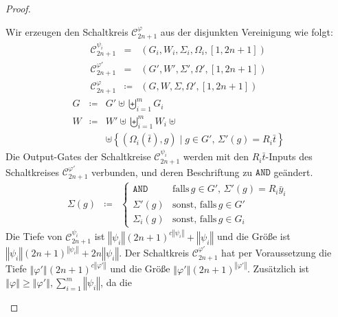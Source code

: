 \begin{proof}
\begin{casenv}
Wir erzeugen den Schaltkreis $\mathcal{C}_{2n+1}^{\varphi}$ aus der
disjunkten Vereinigung wie folgt:
\begin{eqnarray*}
\mathcal{C}_{2n+1}^{\psi_{i}} & = & \left(G_{i},W_{i},\Sigma_{i},\Omega_{i},\left[1,2n+1\right]\right)\\
\mathcal{C}_{2n+1}^{\varphi'} & = & \left(G',W',\Sigma',\Omega',\left[1,2n+1\right]\right)\\
\mathcal{C}_{2n+1}^{\varphi} & \coloneqq & \left(G,W,\Sigma,\Omega',\left[1,2n+1\right]\right)
\end{eqnarray*}
\begin{eqnarray*}
G & \coloneqq & G'\uplus\biguplus_{i=1}^{m}G_{i}\\
W & \coloneqq & W'\uplus\biguplus_{i=1}^{m}W_{i}\uplus\\
 &  & \uplus\left\{ \left(\Omega_{i}\left(\bar{t}\right),g\right)\mid g\in G',\,\Sigma'\left(g\right)=R_{i}\bar{t}\right\} 
\end{eqnarray*}
Die Output-Gates der Schaltkreise $\mathcal{C}_{2n+1}^{\psi_{i}}$
werden mit den $R_{i}\bar{t}$-Inputs des Schaltkreises $\mathcal{C}_{2n+1}^{\varphi'}$
verbunden, und deren Beschriftung zu $\mathtt{AND}$ geändert. 
\begin{eqnarray*}
\Sigma\left(g\right) & \coloneqq & \begin{cases}
\mathtt{AND} & \mathrm{falls}\,g\in G',\,\Sigma'\left(g\right)=R_{i}\bar{y}_{i}\\
\Sigma'\left(g\right) & \mathrm{sonst,\,falls}\,g\in G'\\
\Sigma_{i}\left(g\right) & \mathrm{sonst,\,falls}\,g\in G_{i}
\end{cases}
\end{eqnarray*}
Die Tiefe von $\mathcal{C}_{2n+1}^{\psi_{i}}$ ist $\left\Vert \psi_{i}\right\Vert \left(2n+1\right)^{c\left\Vert \psi_{i}\right\Vert }+\left\Vert \psi_{i}\right\Vert $
und die Größe ist $\left\Vert \psi_{i}\right\Vert \left(2n+1\right)^{\left\Vert \psi_{i}\right\Vert }+2n\left\Vert \psi_{i}\right\Vert $.
Der Schaltkreis $\mathcal{C}_{2n+1}^{\varphi'}$ hat per Voraussetzung
die Tiefe $\left\Vert \varphi'\right\Vert \left(2n+1\right)^{c\left\Vert \varphi'\right\Vert }$
und die Größe $\left\Vert \varphi'\right\Vert \left(2n+1\right)^{\left\Vert \varphi'\right\Vert }$.
Zusätzlich ist $\left\Vert \varphi\right\Vert \geqslant\left\Vert \varphi'\right\Vert ,\sum_{i=1}^{m}\left\Vert \psi_{i}\right\Vert $,
da die 


\end{casenv}
\end{proof}
